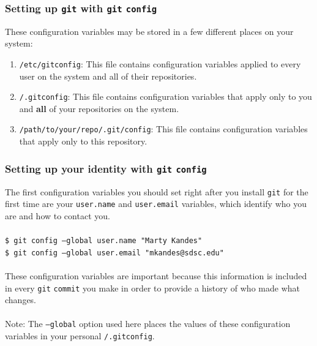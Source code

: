 \documentclass{beamer}
\begin{document}
\begin{frame}
   \frametitle{Setting up \texttt{git} with \texttt{git} \texttt{config}}
   These configuration variables may be stored in a few different places
   on your system: \\
   \begin{enumerate}
      \setlength\itemsep{1.0em}
      \item \texttt{/etc/gitconfig}: This file contains configuration
         variables applied to every user on the system and all of their
         repositories.
      \item \texttt{{\selectfont\texttildelow}/.gitconfig}: 
         This file contains configuration variables that apply only to 
         you and \textbf{all} of your repositories on the system.
      \item \texttt{{\selectfont\texttildelow}/path/to/your/repo/.git/config}: This file contains configuration variables that 
         apply only to this repository.
   \end{enumerate}
\end{frame}

\begin{frame}
   \frametitle{Setting up your identity with \texttt{git} \texttt{config}}
   The first configuration variables you should set right after you install 
   \texttt{git} for the first time are your \texttt{user.name} and 
   \texttt{user.email} variables, which identify who you are and how to 
   contact you. 
   \\ \ \\
   \texttt{\hspace{1.0em}\$ git config --global user.name "Marty Kandes" \\
           \hspace{1.0em}\$ git config --global user.email "mkandes@sdsc.edu"}
   \\ \ \\
   These configuration variables are important because this information 
   is included in every \texttt{git} \texttt{commit} you make in order to 
   provide a history of who made what changes.
   \\ \ \\
   Note: The \texttt{--global} option used here places the values of 
   these configuration variables in your personal 
   \texttt{{\selectfont\texttildelow}/.gitconfig}.
\end{frame}
\end{document}
